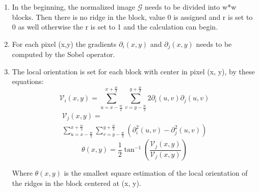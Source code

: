 \begin{enumerate}
	\item In the beginning, the normalized image $\mathcal{G}$ needs to be divided into w*w blocks. Then there is no ridge in the block, value 0 is assigned and r is set to 0 as well otherwise the r is set to 1 and the calculation can begin. \cite{ori}
	
	\item For each pixel (x,y) the gradients  $\partial_{i}(x, y)$ and $\partial_{j}(x, y)$ needs to be computed by the Sobel operator.\cite{ori}
	
	  \item The local orientation is set for each block with center in pixel (x, y), by these equations:\cite{ori}
        \begin{equation} 
            \mathcal{V}_{i}(x, y)=\sum_{u=x-\frac{w}{2}}^{x+\frac{w}{2}} \sum_{v=y-\frac{w}{2}}^{y+\frac{w}{2}} 2 \partial_{i}(u, v) \partial_{j}(u, v)
        \end{equation}
        \begin{equation} 
            \begin{split}
                \mathcal{V}_{j}(x, y)=\\\sum_{u=x-\frac{w}{2}}^{x+\frac{w}{2}} \sum_{v=y-\frac{w}{2}}^{y+\frac{w}{2}}\left(\partial_{i}^{2}(u, v)-\partial_{j}^{2}(u, v)\right)
            \end{split}
        \end{equation}
        \begin{equation} 
            \theta(x, y)=\frac{1}{2} \tan ^{-1}\left(\frac{\mathcal{V}_{j}(x, y)}{\mathcal{V}_{j}(x, y)}\right)
        \end{equation}
        
        Where $\theta(x, y)$ is the smallest square estimation of the local orientation of the ridges in the block centered at (x, y).
         

\end{enumerate}
